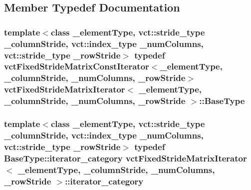 \subsection{Member Typedef Documentation}
\hypertarget{classvct_fixed_stride_matrix_iterator_a9711a47a94c8d65a5f91c5064914f326}{
\subsubsection[{Base\-Type}]{\setlength{\rightskip}{0pt plus 5cm}template$<$class \-\_\-element\-Type, vct\-::stride\-\_\-type \-\_\-column\-Stride, vct\-::index\-\_\-type \-\_\-num\-Columns, vct\-::stride\-\_\-type \-\_\-row\-Stride$>$ typedef {\bf vct\-Fixed\-Stride\-Matrix\-Const\-Iterator}$<$\-\_\-element\-Type, \-\_\-column\-Stride, \-\_\-num\-Columns, \-\_\-row\-Stride$>$ {\bf vct\-Fixed\-Stride\-Matrix\-Iterator}$<$ \-\_\-element\-Type, \-\_\-column\-Stride, \-\_\-num\-Columns, \-\_\-row\-Stride $>$\-::{\bf Base\-Type}}}\label{classvct_fixed_stride_matrix_iterator_a9711a47a94c8d65a5f91c5064914f326}
\hypertarget{classvct_fixed_stride_matrix_iterator_aa33a65dee36b4ac1f9fb5479ce074742}{
\subsubsection[{iterator\-\_\-category}]{\setlength{\rightskip}{0pt plus 5cm}template$<$class \-\_\-element\-Type, vct\-::stride\-\_\-type \-\_\-column\-Stride, vct\-::index\-\_\-type \-\_\-num\-Columns, vct\-::stride\-\_\-type \-\_\-row\-Stride$>$ typedef Base\-Type\-::iterator\-\_\-category {\bf vct\-Fixed\-Stride\-Matrix\-Iterator}$<$ \-\_\-element\-Type, \-\_\-column\-Stride, \-\_\-num\-Columns, \-\_\-row\-Stride $>$\-::{\bf iterator\-\_\-category}}}\label{classvct_fixed_stride_matrix_iterator_aa33a65dee36b4ac1f9fb5479ce074742}
